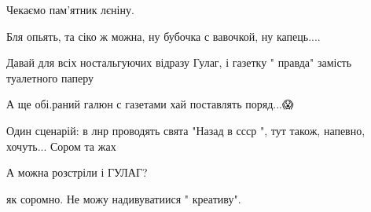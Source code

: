 \begin{itemize}
Чекаємо пам'ятник лєніну.

 
Бля опьять, та сіко ж можна, ну бубочка с вавочкой, ну капець....

 
Давай для всіх ностальгуючих відразу Гулаг, і газетку " правда" замість туалетного паперу \Laughey[1.0][white]

 
А ще обі.раний галюн с газетами хай поставлять поряд...😱🤮

 
Один сценарій: в лнр проводять свята "Назад в ссср ", тут також, напевно, хочуть...
Сором та жах

 
А можна розстріли і ГУЛАГ?

 
як соромно. Не можу надивуватиися " креативу".

 

\end{itemize}

